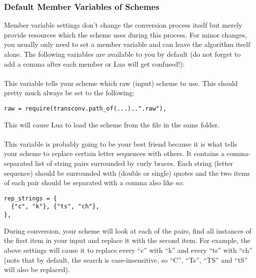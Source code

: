 \documentclass{ltxdockit}
\begin{document}
\subsubsection{Default Member Variables of Schemes}

Member variable settings don't change the conversion process itself but merely
provide resources which the scheme uses during this process. For minor changes,
you usually only need to set a member variable and can leave the algorithm
itself alone. The following variables are available to you by default (do not
forget to add a comma after each member or Lua will get confused!):

\paragraph{}

This variable tells your scheme which raw (input) scheme to use. This should
pretty much always be set to the following:

\begin{lstlisting}
raw = require(transconv.path_of(...)..".raw"),
\end{lstlisting}

This will cause Lua to load the scheme from the  file in the same
folder.

\paragraph{}

This variable is probably going to be your best friend because it is what tells
your scheme to replace certain letter sequences with others. It contains a
comma-separated list of string pairs surrounded by curly braces. Each string
(letter sequence) should be surrounded with (double or single) quotes and the
two items of each pair should be separated with a comma also like so:

\begin{lstlisting}
rep_strings = {
  {"c", "k"}, {"ts", "ch"},
},
\end{lstlisting}

During conversion, your scheme will look at each of the pairs, find all
instances of the first item in your input and replace it with the second item.
For example, the above settings will cause it to replace every \enquote{c} with
\enquote{k} and every \enquote{ts} with \enquote{ch} (note that by
default, the search is case-insensitive, so \enquote{C}, \enquote{Ts},
\enquote{TS} and \enquote{tS} will also be replaced).
\end{document}

